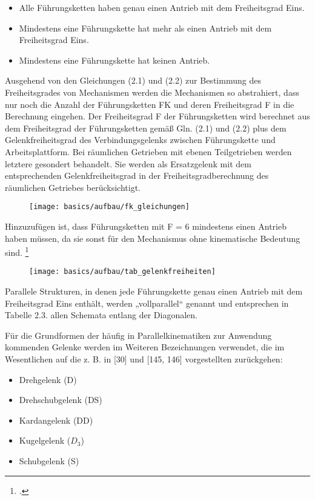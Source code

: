 \begin{itemize}
    \item Alle Führungsketten haben genau einen Antrieb mit dem Freiheitsgrad Eins.
    \item Mindestens eine Führungskette hat mehr als einen Antrieb mit dem Freiheitsgrad Eins.
    \item Mindestens eine Führungskette hat keinen Antrieb.
\end{itemize}

Ausgehend von den Gleichungen (2.1) und (2.2) zur Bestimmung des Freiheitsgrades von Mechanismen werden die Mechanismen so abstrahiert, dass nur noch die Anzahl der Führungsketten FK und deren Freiheitsgrad F in die Berechnung eingehen. Der Freiheitsgrad F der Führungsketten wird berechnet aus dem Freiheitsgrad der Führungsketten gemäß Gln. (2.1) und (2.2) plus dem Gelenkfreiheitsgrad des Verbindungsgelenks zwischen Führungskette und Arbeitsplattform. Bei räumlichen Getrieben mit ebenen Teilgetrieben werden letztere gesondert behandelt. Sie werden als Ersatzgelenk mit dem entsprechenden Gelenkfreiheitsgrad in der Freiheitsgradberechnung des räumlichen Getriebes berücksichtigt.

\begin{figure}[H]
    \centering
    \texttt{[image: basics/aufbau/fk\_gleichungen]}
\end{figure}

Hinzuzufügen ist, dass Führungsketten mit F = 6 mindestens einen Antrieb haben müssen, da sie sonst für den Mechanismus ohne kinematische Bedeutung sind. \footcite[Vgl.][17]{Neugebauer2006}

\begin{figure}[H]
    \centering
    \texttt{[image: basics/aufbau/tab\_gelenkfreiheiten]}
\end{figure}

Parallele Strukturen, in denen jede Führungskette genau einen Antrieb mit dem Freiheitsgrad Eins enthält, werden „vollparallel“ genannt und entsprechen in Tabelle 2.3. allen Schemata entlang der Diagonalen. 

Für die Grundformen der häufig in Parallelkinematiken zur Anwendung kommenden Gelenke werden im Weiteren Bezeichnungen verwendet, die im Wesentlichen auf die z. B. in [30] und [145, 146] vorgestellten zurückgehen:

\begin{itemize}
    \item Drehgelenk (D)
    \item Drehschubgelenk (DS)
    \item Kardangelenk (DD)
    \item Kugelgelenk ($D_3$)
    \item Schubgelenk (S)
\end{itemize}

